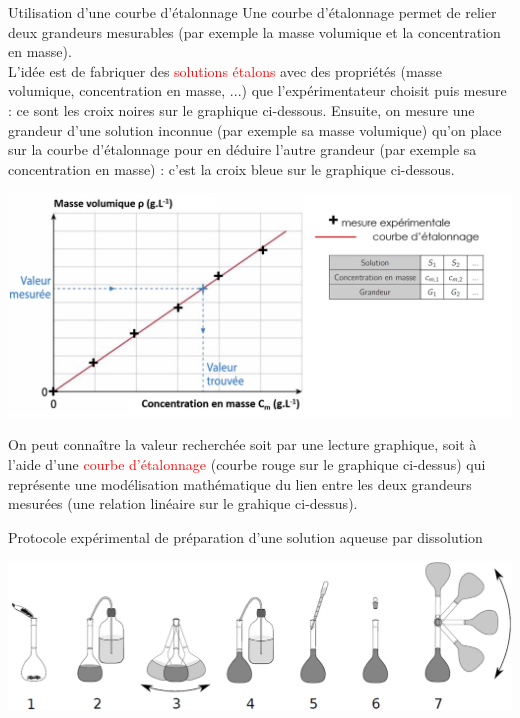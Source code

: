 \begin{doc}{Utilisation d'une courbe d'étalonnage}
Une courbe d'étalonnage permet de relier deux grandeurs mesurables (par exemple la masse volumique et la concentration en masse). \\
L'idée est de fabriquer des \textcolor{red}{solutions étalons} avec des propriétés (masse volumique, concentration en masse, ...) que l'expérimentateur choisit puis mesure : ce sont les croix noires sur le graphique ci-dessous. Ensuite, on mesure une grandeur d'une solution inconnue (par exemple sa masse volumique) qu'on place sur la courbe d'étalonnage pour en déduire l'autre grandeur (par exemple sa concentration en masse) : c'est la croix bleue sur le graphique ci-dessous.
\begin{center}
    \includegraphics[scale=0.5]{Images/TP/TP6/Courbe_etalonnage.png}
\end{center}
On peut connaître la valeur recherchée soit par une lecture graphique, soit à l'aide d'une \textcolor{red}{courbe d'étalonnage} (courbe rouge sur le graphique ci-dessus) qui représente une modélisation mathématique du lien entre les deux grandeurs mesurées (une relation linéaire sur le grahique ci-dessus).
\end{doc}
\begin{doc}{Protocole expérimental de préparation d'une solution aqueuse par dissolution}
\vspace{-0.8cm}
\begin{center}
    \includegraphics[scale=0.5]{Images/TP/TP6/Dissolution.png}
  \end{center}

\end{doc}

